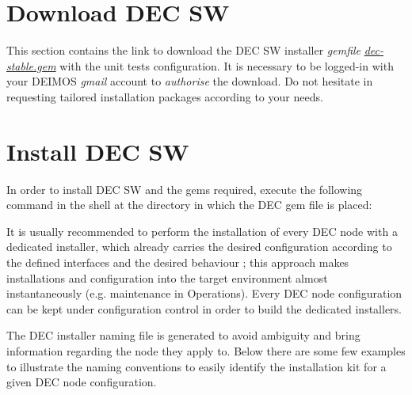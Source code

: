 \documentclass[dec_sum_main.tex]{subfiles}
\begin{document}
 \newline

 \newline



\section{Download DEC SW}
This section contains the link to download the DEC SW installer \textit{gemfile} \href{https://drive.google.com/uc?export=download&id=1gieDRpDEBzKv5Xr0qwPvBz34RHphTnQq}{\textit{dec-stable.gem}} with the unit tests configuration. It is necessary to be logged-in with your DEIMOS \textit{gmail} account to \textit{authorise} the download. Do not hesitate in requesting tailored installation packages according to your needs.

\section{Install DEC SW}

In order to install DEC SW and the gems required, execute the following command in the shell at the directory in which the DEC gem file is placed:
\par
{} \newline
\par

\par
\par
\noindent
It is usually recommended to perform the installation of every DEC node with a dedicated installer, which already carries the desired configuration according to the defined interfaces and the desired behaviour ; this approach makes installations and configuration into the target environment almost instantaneously (e.g. maintenance in Operations). Every DEC node configuration can be kept under configuration control in order to build the dedicated installers.\newline

\noindent
The DEC installer naming file is generated to avoid ambiguity and bring information regarding the node they apply to. Below there are some few examples to illustrate the naming conventions to easily identify the installation kit for a given DEC node configuration.\newline
\par
\end{document}
